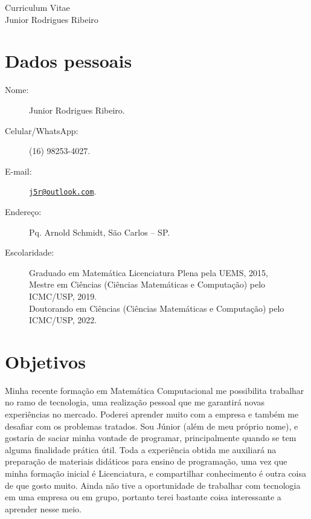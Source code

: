 \documentclass[11pt]{article}
\begin{document}
\begin{center}
\huge \sc Curriculum Vitae\\
\Large \sc Junior Rodrigues Ribeiro
\end{center}

\begin{flushright}
\end{flushright}
\vspace*{-4.4cm}

\section{Dados pessoais\dotfill  \hspace{3.4cm}\ }
\begin{description}
\item[Nome:] Junior Rodrigues Ribeiro.
\item[Celular/WhatsApp:] (16) 98253-4027.
\item[E-mail:] \href{mailto:j5r@outlook.com}{\nolinkurl{j5r@outlook.com}}.
\item[Endereço:] Pq. Arnold Schmidt, São Carlos -- SP.
\item[Escolaridade:] Graduado em Matemática Licenciatura Plena pela UEMS, 2015,\\
\phantom{Escolarid} Mestre em Ciências (Ciências Matemáticas e Computação) pelo ICMC/USP, 2019.\\
\phantom{Escolarid} Doutorando em Ciências (Ciências Matemáticas e Computação) pelo ICMC/USP, 2022.
\end{description}

\section{Objetivos \dotfill}
Minha recente formação em Matemática Computacional me possibilita trabalhar no ramo de tecnologia, uma realização pessoal  que me garantirá novas experiências no mercado. Poderei aprender muito com a empresa e também me desafiar com os problemas tratados. Sou Júnior (além de meu próprio nome), e gostaria de saciar minha vontade de programar,  principalmente quando se tem alguma finalidade prática útil. Toda a experiência obtida me auxiliará na preparação de materiais didáticos para ensino de programação, uma vez que minha formação inicial é Licenciatura, e compartilhar conhecimento é outra coisa de que gosto muito. Ainda não tive a oportunidade de trabalhar com tecnologia em uma empresa ou em grupo, portanto terei bastante coisa interessante a aprender nesse meio.
 
\end{document}
